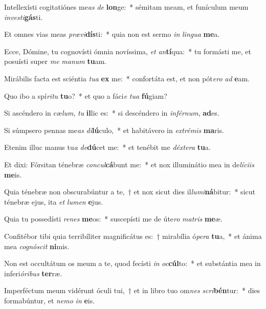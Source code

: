 \item Intellexísti cogitatiónes me\textit{as} \textit{de} \textbf{lon}ge:~* sémitam meam, et funículum meum \textit{in}\textit{ves}\textit{ti}\textbf{gás}ti.
\item Et omnes vias meas \textit{præ}\textit{vi}\textbf{dís}ti:~* quia non est sermo \textit{in} \textit{lin}\textit{gua} \textbf{me}a.
\item Ecce, Dómine, tu cognovísti ómnia novíssima, \textit{et} \textit{an}\textbf{tí}qua:~* tu formásti me, et posuísti super \textit{me} \textit{ma}\textit{num} \textbf{tu}am.
\item Mirábilis facta est sciéntia \textit{tu}\textit{a} \textbf{ex} me:~* confortáta est, et non pót\textit{e}\textit{ro} \textit{ad} \textbf{e}am.
\item Quo ibo a spí\textit{ri}\textit{tu} \textbf{tu}o?~* et quo a fáci\textit{e} \textit{tu}\textit{a} \textbf{fú}giam?
\item Si ascéndero in cæ\textit{lum}, \textit{tu} \textbf{il}lic es:~* si descéndero in \textit{in}\textit{fér}\textit{num}, \textbf{ad}es.
\item Si súmpsero pennas me\textit{as} \textit{di}\textbf{lú}culo,~* et habitávero in \textit{ex}\textit{tré}\textit{mis} \textbf{ma}ris.
\item Etenim illuc manus tu\textit{a} \textit{de}\textbf{dú}cet me:~* et tenébit me \textit{déx}\textit{te}\textit{ra} \textbf{tu}a.
\item Et dixi: Fórsitan ténebræ \textit{con}\textit{cul}\textbf{cá}bunt me:~* et nox illuminátio mea in de\textit{lí}\textit{ci}\textit{is} \textbf{me}is.
\item Quia ténebræ non obscurabúntur a te,~† et nox sicut dies il\textit{lu}\textit{mi}\textbf{ná}bitur:~* sicut ténebræ ejus, ita \textit{et} \textit{lu}\textit{men} \textbf{e}jus.
\item Quia tu possedísti \textit{re}\textit{nes} \textbf{me}os:~* suscepísti me de úte\textit{ro} \textit{ma}\textit{tris} \textbf{me}æ.
\item Confitébor tibi quia terribíliter magnificátus es:~† mirabília ó\textit{pe}\textit{ra} \textbf{tu}a,~* et ánima mea \textit{co}\textit{gnó}\textit{scit} \textbf{ni}mis.
\item Non est occultátum os meum a te, quod fecísti \textit{in} \textit{oc}\textbf{cúl}to:~* et substántia mea in inferi\textit{ó}\textit{ri}\textit{bus} \textbf{ter}ræ.
\item Imperféctum meum vidérunt óculi tui,~† et in libro tuo om\textit{nes} \textit{scri}\textbf{bén}tur:~* dies formabúntur, et \textit{ne}\textit{mo} \textit{in} \textbf{e}is.
